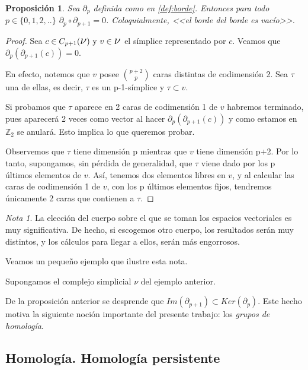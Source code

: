 \documentclass[12pt, a4paper]{article}
\numberwithin{equation}{section}
\theoremstyle{definition}
\newenvironment{ejem}
  {\pushQED{\qed}\renewcommand{\qedsymbol}{$\blacktriangleleft$}\ejemplo}
  {\popQED\endejemplo}
\theoremstyle{remark}
\newtheorem*{remark}{Nota}
\theoremstyle{plain}
\newtheorem{prop}{Proposición}
\begin{document}
	\begin{prop}
		Sea $\partial_{p}$ definida como en \ref{def:borde}. Entonces 
		para todo $p \in \{0,1,2,..\}$ $\partial_{p}\circ 
		\partial_{p+1}=0$. Coloquialmente, <<el borde del borde es 
		vacío>>.
	\end{prop}
	\begin{proof}
		Sea $c \in C_{p+1}(\text{{\Large $\nu$}})\text{ y }v\in 
		\text{{\Large $\nu$}}$ el símplice representado por $c$. 
		Veamos que $\partial_{p}(\partial_{p+1}(c))=0$.

		En efecto, notemos que $v$ posee $\binom{p+2}{p}$ 
		caras distintas de codimensión 2. Sea $\tau$ una de ellas, es 
		decir, $\tau$ es un p-1-símplice y $\tau \subset v$.

		Si probamos que $\tau$ aparece en 2 caras de codimensión 1 de 
		$v$ habremos terminado, pues aparecerá 2 veces como vector al 
		hacer $\partial_{p}(\partial_{p+1}(c))$ y como estamos en 
		$\mathbb{Z}_{2}$ se anulará. Esto implica lo que queremos
		probar.

		Observemos que $\tau$ tiene dimensión p mientras que $v$ tiene
		dimensión p+2. Por lo tanto, supongamos, sin pérdida de 
		generalidad, que $\tau$ viene dado por los p últimos elementos 
		de $v$. Así, tenemos dos elementos libres en $v$, y al 
		calcular las caras de codimensión 1 de $v$, con los p últimos 
		elementos fijos, tendremos únicamente 2 caras que contienen a
		$\tau$.  	
	\end{proof}
	\begin{remark}
		La elección del cuerpo sobre el que se toman los espacios 
		vectoriales es muy significativa. De hecho, si escogemos otro 
		cuerpo, los resultados serán muy distintos, y los cálculos 
		para llegar a ellos, serán más engorrosos.
	\end{remark}

	Veamos un pequeño ejemplo que ilustre esta nota.

	\begin{ejem}
		Supongamos el complejo simplicial {\Large $\nu$} del ejemplo 
		anterior. 
	\end{ejem}

	De la proposición anterior se desprende que $Im(\partial_{p+1}) 
	\subset Ker(\partial_{p})$. Este hecho motiva la siguiente noción 
	importante del presente trabajo: los \emph{grupos de homología}.
 

	\subsection{Homología. Homología persistente}
	
\end{document}
